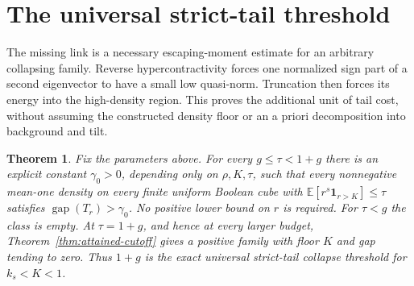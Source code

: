 \documentclass[11pt]{article}
\newtheorem{theorem}{Theorem}
\newcommand{\gap}{\operatorname{gap}}
\begin{document}
\section{The universal strict-tail threshold}\label{sec:universal-tail}
The missing link is a necessary escaping-moment estimate for an arbitrary
collapsing family. Reverse hypercontractivity forces one normalized sign
part of a second eigenvector to have a small low quasi-norm. Truncation
then forces its energy into the high-density region. This proves the
additional unit of tail cost, without assuming the constructed density
floor or an a priori decomposition into background and tilt.

\begin{theorem}\label{thm:universal-tail}
Fix the parameters above. For every $g\le\tau<1+g$ there is an explicit
constant $\gamma_0>0$, depending only on $\rho,K,\tau$, such that every
nonnegative mean-one density on every finite uniform Boolean cube with
$\mathbb E[r^s\mathbf1_{r>K}]\le\tau$ satisfies
$\gap(T_r)>\gamma_0$. No positive lower bound on $r$ is required.
For $\tau<g$ the class is empty. At $\tau=1+g$, and hence at every larger
budget, Theorem~\ref{thm:attained-cutoff} gives a positive family with
floor $K$ and gap tending to zero. Thus $1+g$ is the exact universal
strict-tail collapse threshold for $k_s<K<1$.
\end{theorem}
\end{document}
